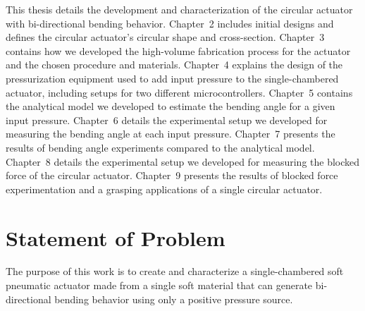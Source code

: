 This thesis details the development and characterization of the circular actuator with bi-directional bending behavior. Chapter~2 includes initial designs and defines the circular actuator's circular shape and cross-section. Chapter~3 contains how we developed the high-volume fabrication process for the actuator and the chosen procedure and materials. Chapter~4 explains the design of the pressurization equipment used to add input pressure to the single-chambered actuator, including setups for two different microcontrollers. Chapter~5 contains the analytical model we developed to estimate the bending angle for a given input pressure. Chapter~6 details the experimental setup we developed for measuring the bending angle at each input pressure. Chapter~7 presents the results of bending angle experiments compared to the analytical model. Chapter~8 details the experimental setup we developed for measuring the blocked force of the circular actuator. Chapter~9 presents the results of blocked force experimentation and a grasping applications of a single circular actuator. 

\clearpage
\section{Statement of Problem}

The purpose of this work is to create and characterize a single-chambered soft pneumatic actuator made from a single soft material that can generate bi-directional bending behavior using only a positive pressure source. 